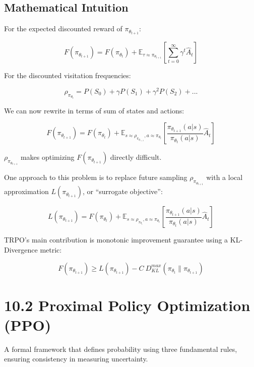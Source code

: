 \documentclass[
  letterpaper,
  DIV=11,
  numbers=noendperiod]{scrreprt}
\begin{document}
\section{Mathematical Intuition}\label{mathematical-intuition-2}

For the expected discounted reward of \(\pi_{\theta_{t+1}}\):

\[
F(\pi_{\theta_{t+1}}) = F(\pi_{\theta_{t}}) + \mathbb{E}_{\tau \approx \pi_{\theta_{t+1}}} [\sum^{\infty}_{t=0} \gamma^{t} \hat{A}_t]
\]

For the discounted visitation frequencies:

\[
\rho_{\pi_{\theta_{t}}} = P(S_{0}) + \gamma P(S_{1}) + \gamma^{2} P(S_{2}) + ...
\]

We can now rewrite in terms of sum of states and actions:

\[
F(\pi_{\theta_{t+1}}) = F(\pi_{\theta_{t}}) + \mathbb{E}_{s \approx \rho_{\pi_{\theta_{t+1}}}, a \approx \pi_{\theta_{t}}} \left[\frac{\pi_{\theta_{t+1}}(a|s)}{\pi_{\theta_{t}}(a|s)} \hat{A}_t\right]
\]

\(\rho_{\pi_{\theta_{t+1}}}\) makes optimizing \(F(\pi_{\theta_{t+1}})\)
directly difficult.

One approach to this problem is to replace future sampling
\(\rho_{\pi_{\theta_{t+1}}}\) with a local approximation
\(L(\pi_{\theta_{t+1}})\), or ``surrogate objective'':

\[
L(\pi_{\theta_{t+1}}) =  F(\pi_{\theta_{t}}) + \mathbb{E}_{s \approx \rho_{\pi_{\theta_{t}}}, a \approx \pi_{\theta_{t}}} \left[\frac{\pi_{\theta_{t+1}}(a|s)}{\pi_{\theta_{t}}(a|s)} \hat{A}_t\right]
\]

TRPO's main contribution is monotonic improvement guarantee using a
KL-Divergence metric:

\[
F(\pi_{\theta_{t+1}}) \geq L(\pi_{\theta_{t+1}}) - C \ D^{max}_{KL}(\pi_{\theta_{t}} \| \pi_{\theta_{t+1}})
\]

\chapter{10.2 Proximal Policy Optimization
(PPO)}\label{proximal-policy-optimization-ppo}

\begin{tcolorbox}[enhanced jigsaw, arc=.35mm, toprule=.15mm, leftrule=.75mm, colback=white, left=2mm, colframe=quarto-callout-note-color-frame, rightrule=.15mm, opacityback=0, breakable, bottomrule=.15mm]

A formal framework that defines probability using three fundamental
rules, ensuring consistency in measuring uncertainty. 🎲

\end{tcolorbox}
\end{document}
